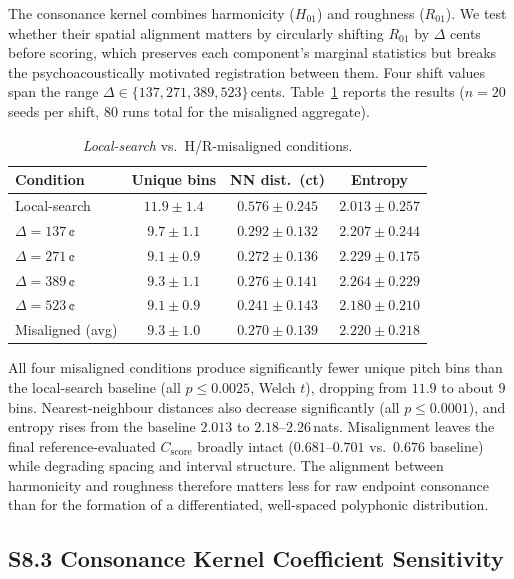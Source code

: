 \documentclass[letterpaper]{article}
\begin{document}
The consonance kernel combines harmonicity ($H_{01}$) and roughness ($R_{01}$).
We test whether their spatial alignment matters by circularly shifting $R_{01}$ by $\Delta$ cents before scoring, which preserves each component's marginal statistics but breaks the psychoacoustically motivated registration between them.
Four shift values span the range $\Delta \in \{137, 271, 389, 523\}$\,cents.
Table~\ref{tab:misaligned} reports the results ($n=20$ seeds per shift, 80 runs total for the misaligned aggregate).

\begin{table}[h]
\centering
\caption{\emph{Local-search} vs.\ H/R-misaligned conditions.}
\label{tab:misaligned}
\footnotesize
{\setlength{\tabcolsep}{4pt}
\begin{tabular}{@{}lccc@{}}
\toprule
Condition & Unique bins & NN dist.\ (ct) & Entropy \\
\midrule
Local-search        & $11.9 \pm 1.4$ & $0.576 \pm 0.245$ & $2.013 \pm 0.257$ \\
$\Delta = 137$\,¢   & $9.7 \pm 1.1$ & $0.292 \pm 0.132$ & $2.207 \pm 0.244$ \\
$\Delta = 271$\,¢   & $9.1 \pm 0.9$ & $0.272 \pm 0.136$ & $2.229 \pm 0.175$ \\
$\Delta = 389$\,¢   & $9.3 \pm 1.1$ & $0.276 \pm 0.141$ & $2.264 \pm 0.229$ \\
$\Delta = 523$\,¢   & $9.1 \pm 0.9$ & $0.241 \pm 0.143$ & $2.180 \pm 0.210$ \\
\midrule
Misaligned (avg)    & $9.3 \pm 1.0$ & $0.270 \pm 0.139$ & $2.220 \pm 0.218$ \\
\bottomrule
\end{tabular}
}
\end{table}

All four misaligned conditions produce significantly fewer unique pitch bins than the local-search baseline (all $p \le 0.0025$, Welch $t$), dropping from $11.9$ to about $9$ bins.
Nearest-neighbour distances also decrease significantly (all $p \le 0.0001$), and entropy rises from the baseline $2.013$ to $2.18$--$2.26$\,nats.
Misalignment leaves the final reference-evaluated $C_{\text{score}}$ broadly intact ($0.681$--$0.701$ vs.\ $0.676$ baseline) while degrading spacing and interval structure.
The alignment between harmonicity and roughness therefore matters less for raw endpoint consonance than for the formation of a differentiated, well-spaced polyphonic distribution.

\subsection{S8.3 Consonance Kernel Coefficient Sensitivity}
\end{document}
